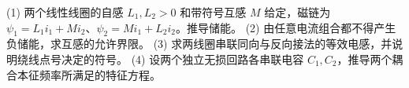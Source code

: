 (1) 两个线性线圈的自感 \(L_1,L_2>0\) 和带符号互感 \(M\) 给定，磁链为 \(\psi_1=L_1i_1+Mi_2\)、\(\psi_2=Mi_1+L_2i_2\)。推导储能。
(2) 由任意电流组合都不得产生负储能，求互感的允许界限。
(3) 求两线圈串联同向与反向接法的等效电感，并说明绕线点号决定的符号。
(4) 设两个独立无损回路各串联电容 \(C_1,C_2\)，推导两个耦合本征频率所满足的特征方程。
